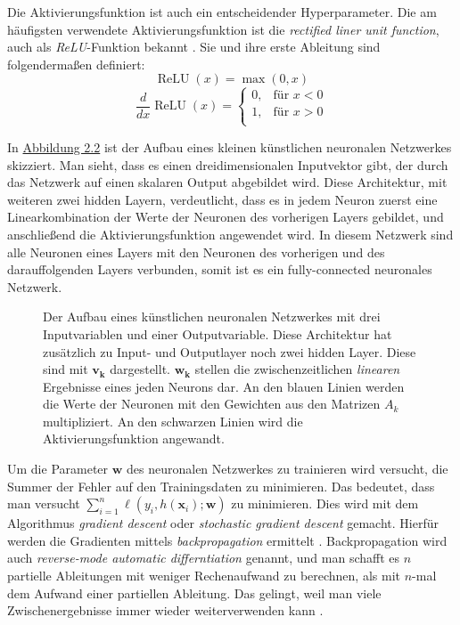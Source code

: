 Die Aktivierungsfunktion ist auch ein entscheidender Hyperparameter. Die am h\"aufigsten verwendete Aktivierungsfunktion ist die \textit{rectified liner unit function},
auch als \textit{ReLU}-Funktion bekannt \cite{activation}. Sie und ihre erste Ableitung sind folgenderma{\ss}en definiert:
$$ \operatorname{ReLU}(x) = \max(0,x)$$
$$ \frac{d}{dx}\operatorname{ReLU}(x) =
	\left\{
	\begin{array}{lr}
		0, & \text{für }x < 0 \\
		1, & \text{für }x > 0 \\
	\end{array}
	\right.
$$


In \hyperref[fig:nn]{Abbildung 2.2} ist der Aufbau eines kleinen k\"unstlichen neuronalen Netzwerkes skizziert. Man sieht, dass es einen dreidimensionalen Inputvektor gibt, der
durch das Netzwerk auf einen skalaren Output abgebildet wird. Diese Architektur, mit weiteren zwei hidden Layern, verdeutlicht, dass es in jedem Neuron zuerst eine Linearkombination der
Werte der Neuronen des vorherigen Layers gebildet, und anschlie{\ss}end die Aktivierungsfunktion angewendet wird. In diesem Netzwerk sind alle Neuronen eines Layers mit den Neuronen
des vorherigen und des darauffolgenden Layers verbunden, somit ist es ein fully-connected neuronales Netzwerk.

\begin{figure}[ht]
	\label{fig:nn}
	\begin{center}
	\end{center}
	\caption[K\"unstliches Neuronales Netzwerk]
	{Der Aufbau eines k\"unstlichen neuronalen Netzwerkes mit drei Inputvariablen und einer Outputvariable. Diese Architektur hat zus\"atzlich zu Input- und Outputlayer
		noch zwei hidden Layer. Diese sind mit $\mathbf{v_k}$ dargestellt. $\mathbf{w_k}$ stellen die zwischenzeitlichen \textit{linearen} Ergebnisse eines jeden Neurons dar.
		An den blauen Linien werden die Werte der Neuronen mit den Gewichten aus den Matrizen $A_k$ multipliziert. An den schwarzen Linien wird die Aktivierungsfunktion angewandt.}
\end{figure}

Um die Parameter $\mathbf{w}$ des neuronalen Netzwerkes zu trainieren wird versucht, die Summer der Fehler auf den Trainingsdaten zu minimieren. Das bedeutet, dass
man versucht $\sum_{i=1}^n \ell(y_i, h(\mathbf{x}_i); \mathbf{w})$ zu minimieren. Dies wird mit dem Algorithmus \textit{gradient descent} oder \textit{stochastic gradient descent}
gemacht. Hierf\"ur werden die Gradienten mittels \textit{backpropagation} ermittelt \cite{werbos}. Backpropagation wird auch \textit{reverse-mode automatic differntiation} genannt, und man
schafft es $n$ partielle Ableitungen mit weniger Rechenaufwand zu berechnen, als mit $n$-mal dem Aufwand einer partiellen Ableitung. Das gelingt, weil man viele
Zwischenergebnisse immer wieder weiterverwenden kann \cite[Kaptitel 7.3]{strang}.